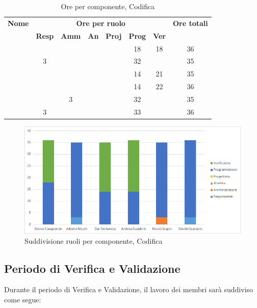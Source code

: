 \begin{table}[H]
	\begin{center}
		\begin{tabular}{|c|c|c|c|c|c|c|c|}
			\hline
			\textbf{Nome} & \multicolumn{6}{c|}{\textbf{Ore per ruolo}} & \textbf{Ore totali} \\\cline{2-7}
			& \textbf{Resp} & \textbf{Amm} & \textbf{An} & \textbf{Proj} & \textbf{Prog} & \textbf{Ver} & \\
			\hline
			\MC			&		&		&		&		&	18	&	18	&	36	\\
			\hline
			\AN			&	3	&		&		&	 	&	32	&		& 	35	\\
			\hline
			\DAN		&		&		&		&		&	14	&	21	&	35	\\
			\hline
			\AS			&		&	 	&	 	&		&	14 	& 	22	&	36	\\
			\hline
			\NS 		&		&	3	&		&		&	32	& 		&	35	\\
			\hline
			\DS			& 	3	&		&		&		&	33	&		&	36	\\
			\hline
		\end{tabular}
	\end{center}
	\caption{Ore per componente, Codifica}
\end{table}

\begin{figure}[H]
	\centering
	\includegraphics[scale=0.6]{img/6-4.png}
	\caption{Suddivisione ruoli per componente, Codifica}
\end{figure}

\newpage
\subsection{Periodo di Verifica e Validazione}
Durante il periodo di Verifica e Validazione, il lavoro dei membri sarà suddiviso come segue:

